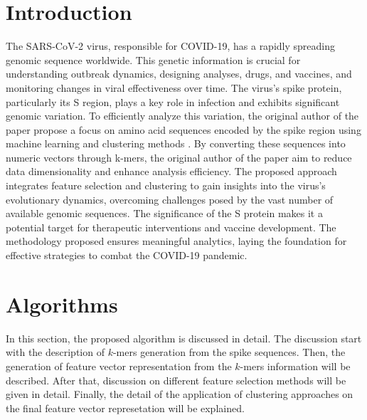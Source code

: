 \documentclass[%
 aip,
 jmp,%
 amsmath,amssymb,
 reprint,%
]{revtex4-2}
\begin{document}


\section{Introduction}
The SARS-CoV-2 virus, responsible for COVID-19, has a rapidly spreading genomic sequence worldwide.
This genetic information is crucial for understanding outbreak dynamics, designing analyses, drugs,
and vaccines, and monitoring changes in viral effectiveness over time. The virus's spike protein,
particularly its S region, plays a key role in infection and exhibits significant genomic variation.
To efficiently analyze this variation, the original author of the paper propose a focus on amino acid sequences
encoded by the spike region using machine learning and clustering methods \cite{ref1}. By converting these sequences
into numeric vectors through k-mers, the original author of the paper aim to reduce data dimensionality and enhance
analysis efficiency. The proposed approach integrates feature selection and clustering to gain insights
into the virus's evolutionary dynamics, overcoming challenges posed by the vast number of available genomic
sequences. The significance of the S protein makes it a potential target for therapeutic interventions and
vaccine development. The methodology proposed ensures meaningful analytics, laying the foundation for effective
strategies to combat the COVID-19 pandemic.

\section{Algorithms}
In this section, the proposed algorithm is discussed in detail. The discussion start with the
description of $k$-mers generation from the spike sequences. Then, the generation of
feature vector representation from the $k$-mers information will be described. After that,
discussion on different feature selection methods will be given in detail. Finally, the
detail of the application of clustering approaches on the final feature vector represetation
will be explained.
\end{document}
